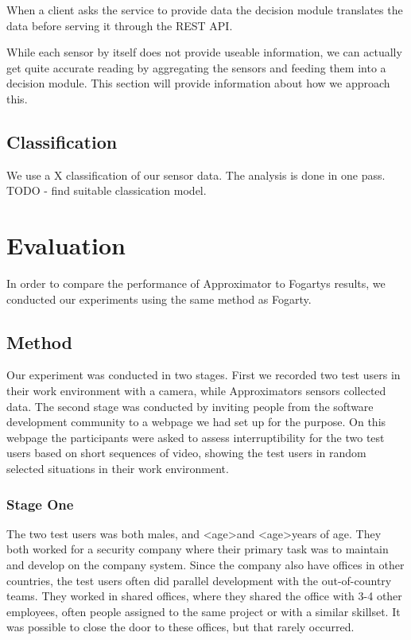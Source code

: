 \documentclass{sigchi}
\begin{document}
When a client asks the service to provide data the decision module translates the data before serving it through the REST API.

While each sensor by itself does not provide useable information, we can actually get quite accurate reading by aggregating the sensors and feeding them into a decision module.
This section will provide information about how we approach this.

\subsection{Classification}
We use a X classification of our sensor data.
The analysis is done in one pass.
TODO - find suitable classication model.


\section{Evaluation}
In order to compare the performance of Approximator to Fogartys results, we conducted our experiments using the same method as Fogarty.

\subsection{Method}
Our experiment was conducted in two stages.
First we recorded two test users in their work environment with a camera, while Approximators sensors collected data.
The second stage was conducted by inviting people from the software development community to a webpage we had set up for the purpose.
On this webpage the participants were asked to assess interruptibility for the two test users based on short sequences of video, showing the test users in random selected situations in their work environment.

\subsubsection{Stage One}
The two test users was both males, and \textless age\textgreater and \textless age\textgreater years of age.
They both worked for a security company where their primary task was to maintain and develop on the company system.
Since the company also have offices in other countries, the test users often did parallel development with the out-of-country teams.
They worked in shared offices, where they shared the office with 3-4 other employees, often people assigned to the same project or with a similar skillset.
It was possible to close the door to these offices, but that rarely occurred.
\end{document}
